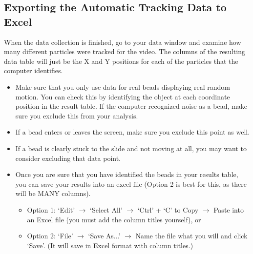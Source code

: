 \subsection*{Exporting the Automatic Tracking Data to Excel}
When the data collection is finished, go to your data window and examine how many different particles were tracked for the video. 
The columns of the resulting data table will just be the X and Y positions for each of the particles that the computer identifies.
\begin{itemize}
\item Make sure that you only use data for real beads displaying real random motion. 
You can check this by identifying the object at each coordinate position in the result table. 
If the computer recognized noise as a bead, make sure you exclude this from your analysis. 
\item If a bead enters or leaves the screen, make sure you exclude this point as well. 
\item If a bead is clearly stuck to the slide and not moving at all, you may want to consider excluding that data point. 
\item Once you are sure that you have identified the beads in your results table, you can save your results into an excel file (Option 2 is best for this, as there will be MANY columns).
\begin{itemize}
\item Option 1: `Edit' $\rightarrow$ `Select All' $\rightarrow$ `Ctrl' + `C' to Copy $\rightarrow$ Paste into an Excel file (you must add the column titles yourself), or
\item Option 2: `File' $\rightarrow$ `Save As...' $\rightarrow$ Name the file what you will and click `Save'. (It will save in Excel format with column titles.)
\end{itemize}
\end{itemize}
